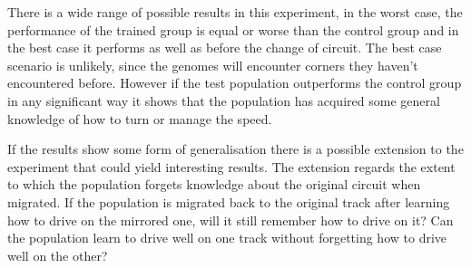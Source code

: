 
There is a wide range of possible results in this experiment, in the worst case, the performance of the trained group is equal or worse than the control group and in the best case it performs as well as before the change of circuit. The best case scenario is unlikely, since the genomes will encounter corners they haven't encountered before. However if the test population outperforms the control group in any significant way it shows that the population has acquired some general knowledge of how to turn or manage the speed. 

If the results show some form of generalisation there is a possible extension to the experiment that could yield interesting results. The extension regards the extent to which the population forgets knowledge about the original circuit when migrated. If the population is migrated back to the original track after learning how to drive on the mirrored one, will it still remember how to drive on it? Can the population learn to drive well on one track without forgetting how to drive well on the other?
